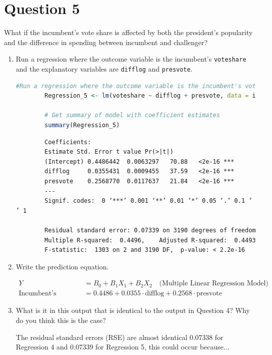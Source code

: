 \documentclass[12pt,letterpaper]{article}
\begin{document}
\section*{Question 5}
\noindent What if the incumbent's vote share is affected by both the president's popularity and the difference in spending between incumbent and challenger? 
	\begin{enumerate}
		\item Run a regression where the outcome variable is the incumbent's \texttt{voteshare} and the explanatory variables are \texttt{difflog} and \texttt{presvote}.	\vspace{0cm}
		
		\begin{lstlisting}[language=R, caption={Regression Model 5 in R}, label={lst:regression_model}]
		#Run a regression where the outcome variable is the incumbent's voteshare and the explanatory variables are difflog and presvote.
		Regression_5 <- lm(voteshare ~ difflog + presvote, data = incumbents_subset)
			
		# Get summary of model with coefficient estimates
		summary(Regression_5)
		\end{lstlisting}
		
		\begin{verbatim}
		Coefficients:
		Estimate Std. Error t value Pr(>|t|)    
		(Intercept) 0.4486442  0.0063297   70.88   <2e-16 ***
		difflog     0.0355431  0.0009455   37.59   <2e-16 ***
		presvote    0.2568770  0.0117637   21.84   <2e-16 ***
		---
		Signif. codes:  0 ‘***’ 0.001 ‘**’ 0.01 ‘*’ 0.05 ‘.’ 0.1 ‘ ’ 1
		
		Residual standard error: 0.07339 on 3190 degrees of freedom
		Multiple R-squared:  0.4496,	Adjusted R-squared:  0.4493 
		F-statistic:  1303 on 2 and 3190 DF,  p-value: < 2.2e-16
			\end{verbatim}
		
		\item Write the prediction equation.	\vspace{0cm}
			
		\begin{align*}
		Y &= B_0 + B_1X_1 + B_2X_2 \quad \text{(Multiple Linear Regression Model)} \\
		\text{Incumbent's Voteshare} &= 0.4486 + 0.0355 \cdot \text{difflog} + 0.2568 \cdot \text{presvote}
		\end{align*}
		
		\item What is it in this output that is identical to the output in Question 4? Why do you think this is the case?
		
		The residual standard errors (RSE) are almost identical 0.07338 for Regression 4
		and 0.07339 for Regression 5, this could occur because...
		
	\end{enumerate}
\end{document}
